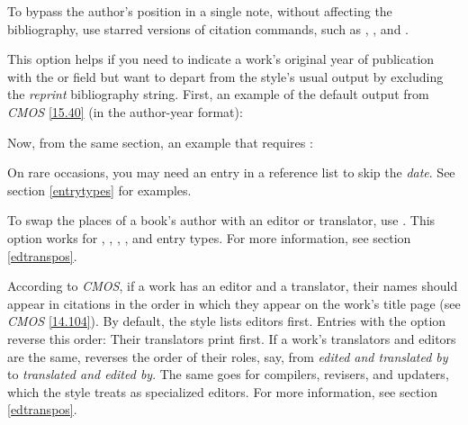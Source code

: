 \documentclass[11pt,letterpaper,oneside]{article}
\begin{document}
\begin{optionlist}
\begin{citebib}
\item \cite{chaucer1966}
\end{citebib}

\noindent To bypass the author's position in a single note, without
affecting the bibliography, use starred versions of citation commands,
such as , , and .


\noindent This option helps if you need to indicate a work's original
year of publication with the  or
 field but want to depart from the style's usual
output by excluding the \textit{reprint} bibliography string. First,
an example of the default output from \textit{CMOS} \ref{15.40} (in
the author-year format):

\begin{refonly}
\nocite{maitland1998}
\end{refonly}

\noindent Now, from the same section, an example that requires
:

\begin{refonly}
\nocite{darwin1964}
\end{refonly}


\noindent On rare occasions, you may need an entry in a reference list
to skip the \textit{date}. See section \ref{entrytypes} for examples.


\noindent To swap the places of a book's author with an editor or
translator, use . This option works for ,
, , , and
 entry types. For more information, see section
\ref{edtranspos}.


\noindent According to \textit{CMOS}, if a work has an editor and a
translator, their names should appear in citations in the order in
which they appear on the work's title page (see \textit{CMOS}
\ref{14.104}). By default, the style lists editors first. Entries with
the option  reverse this order: Their translators
print first. If a work's translators and editors are the same,
 reverses the order of their roles, say, from
\textit{edited and translated by} to \textit{translated and edited
by}. The same goes for compilers, revisers, and updaters, which the
style treats as specialized editors. For more information, see section
\ref{edtranspos}.


\end{optionlist}
\end{document}
